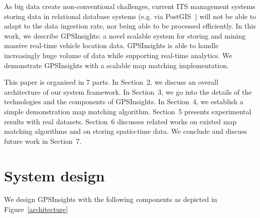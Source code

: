\documentclass{acm_proc_article-sp}
\begin{document}
As big data create non-conventional challenges, current ITS management systems storing data in relational database systems (e.g. via PostGIS~\cite{posgis}) will not be able to adapt to the data ingestion rate, nor being able to be processed efficiently. In this work, we describe GPSInsights: a novel scalable system for storing and mining massive real-time vehicle location data. GPSInsights is able to handle increasingly huge volume of data while supporting real-time analytics. We demonstrate GPSInsights with a scalable map matching implementation. 

This paper is organised in 7 parts. In Section~2, we discuss an overall architecture of our system framework. In Section~3, we go into the details of the technologies and the components of GPSInsights. In Section~4, we establish a simple demonstration map matching algorithm. Section~5 presents experimental results with real datasets. Section~6 discusses related works on existed map matching algorithms and on storing spatio-time data. We conclude and discuss future work in Section~7.
	
\section{System design} 

We design GPSInsights with the following components as depicted in Figure~\ref{architecture}
\end{document}
